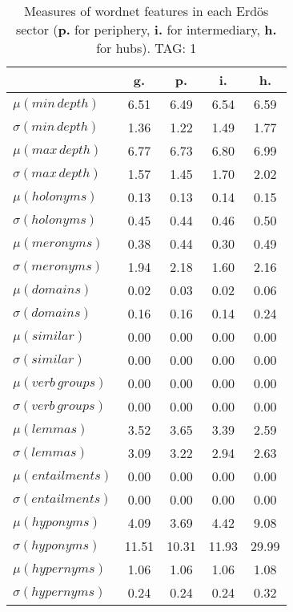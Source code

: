 \begin{table}[h!]
\begin{center}
\begin{tabular}{| l | c | c | c | c |}\hline
 & g. & p. & i. & h. \\\hline
$\mu(min\,depth)$ & 6.51  & 6.49  & 6.54  & 6.59 \\\hline
$\sigma(min\,depth)$ & 1.36  & 1.22  & 1.49  & 1.77 \\\hline
$\mu(max\,depth)$ & 6.77  & 6.73  & 6.80  & 6.99 \\\hline
$\sigma(max\,depth)$ & 1.57  & 1.45  & 1.70  & 2.02 \\\hline
$\mu(holonyms)$ & 0.13  & 0.13  & 0.14  & 0.15 \\\hline
$\sigma(holonyms)$ & 0.45  & 0.44  & 0.46  & 0.50 \\\hline
$\mu(meronyms)$ & 0.38  & 0.44  & 0.30  & 0.49 \\\hline
$\sigma(meronyms)$ & 1.94  & 2.18  & 1.60  & 2.16 \\\hline
$\mu(domains)$ & 0.02  & 0.03  & 0.02  & 0.06 \\\hline
$\sigma(domains)$ & 0.16  & 0.16  & 0.14  & 0.24 \\\hline
$\mu(similar)$ & 0.00  & 0.00  & 0.00  & 0.00 \\\hline
$\sigma(similar)$ & 0.00  & 0.00  & 0.00  & 0.00 \\\hline
$\mu(verb\,groups)$ & 0.00  & 0.00  & 0.00  & 0.00 \\\hline
$\sigma(verb\,groups)$ & 0.00  & 0.00  & 0.00  & 0.00 \\\hline
$\mu(lemmas)$ & 3.52  & 3.65  & 3.39  & 2.59 \\\hline
$\sigma(lemmas)$ & 3.09  & 3.22  & 2.94  & 2.63 \\\hline
$\mu(entailments)$ & 0.00  & 0.00  & 0.00  & 0.00 \\\hline
$\sigma(entailments)$ & 0.00  & 0.00  & 0.00  & 0.00 \\\hline
$\mu(hyponyms)$ & 4.09  & 3.69  & 4.42  & 9.08 \\\hline
$\sigma(hyponyms)$ & 11.51  & 10.31  & 11.93  & 29.99 \\\hline
$\mu(hypernyms)$ & 1.06  & 1.06  & 1.06  & 1.08 \\\hline
$\sigma(hypernyms)$ & 0.24  & 0.24  & 0.24  & 0.32 \\\hline
\end{tabular}
\caption{Measures of wordnet features in each Erd\"os sector ({{\bf p.}} for periphery, {{\bf i.}} for intermediary, {{\bf h.}} for hubs). TAG: 1}
\end{center}
\end{table}
